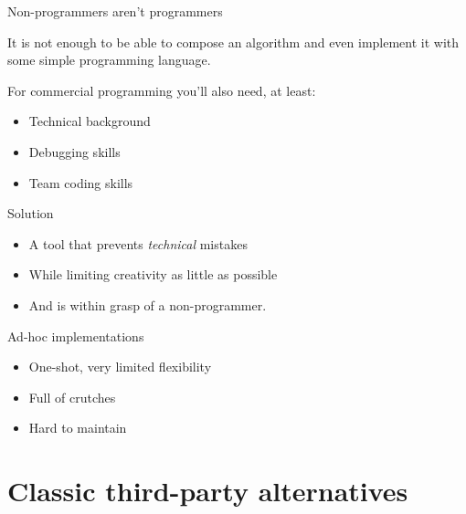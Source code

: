 \documentclass[handout]{beamer}
\begin{document}
\begin{frame}{Non-programmers aren't programmers}

It is not enough to be able to compose an algorithm and even implement it
with some simple programming language.

For commercial programming you'll also need, at least:

\begin{itemize}
\item Technical background
\item Debugging skills
\item Team coding skills
\end{itemize}

\end{frame}


\begin{frame}{Solution}

\begin{itemize}
\item A tool that prevents \textit{technical} mistakes
\item While limiting creativity as little as possible
\item And is within grasp of a non-programmer.
\end{itemize}

\end{frame}


\begin{frame}{Ad-hoc implementations}

\begin{itemize}
\item One-shot, very limited flexibility
\item Full of crutches
\item Hard to maintain
\end{itemize}

\end{frame}


\section{Classic third-party alternatives}
\end{document}
